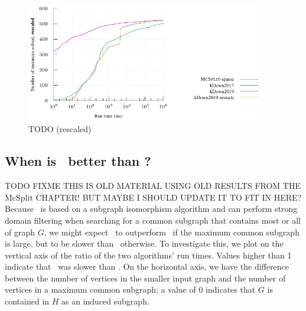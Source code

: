 \begin{figure}[htb]
    \centering
    \includegraphics*[width=0.92\textwidth]{14b-mcsplit-induced-si/sip-instances-mcis-experiment/experiment/plots/cumulative-rescaled.pdf}
    \caption{TODO (rescaled)}
    \label{figure:mcsplit-sparse-cumulative-rescaled}
\end{figure}

\subsection{When is \kDown\ better than \McSplitDown?}

TODO FIXME THIS IS OLD MATERIAL USING OLD RESULTS FROM THE McSplit CHAPTER! BUT
MAYBE I SHOULD UPDATE IT TO FIT IN HERE?
Because \kDown\ is based on a subgraph isomorphism algorithm and can perform strong
domain filtering when searching for a common subgraph that contains most or
all of graph $G$, we might expect \kDown\ to outperform \McSplitDown\ if the maximum
common subgraph is large, but to be slower than \McSplitDown\ otherwise.
To investigate this, we plot on the vertical axis of  the ratio of the two
algorithms' run times.  Values higher than 1 indicate that \kDown\ was slower than
\McSplitDown.  On the horizontal axis, we have the difference between the number of
vertices in the smaller input graph and the number of vertices in a maximum
common subgraph; a value of 0 indicates that $G$ is contained in $H$ as an induced subgraph.

